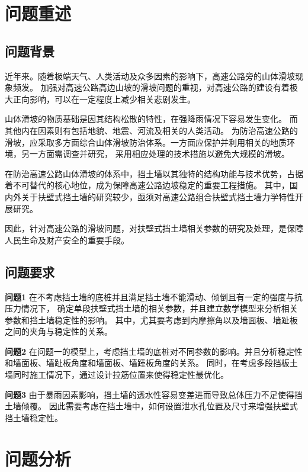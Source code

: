 \documentclass[withoutpreface,bwprint]{cumcmthesis}
\begin{document}
\section{问题重述}
\subsection{问题背景}
近年来。随着极端天气、人类活动及众多因素的影响下，高速公路旁的山体滑坡现象频发。
加强对高速公路高边山坡的滑坡问题的重视，对高速公路的建设有着极大正向影响，可以在一定程度上减少相关悲剧发生。
\par
山体滑坡的物质基础是因其结构松散的特性，在强降雨情况下容易发生变化。
而其他内在因素则有包括地貌、地震、河流及相关的人类活动。
为防治高速公路的滑坡，应采取多方面综合山体滑坡防治体系。一方面应保护并利用相关的地质环境，另一方面需调查并研究，
采用相应处理的技术措施以避免大规模的滑坡。
\par
在防治高速公路山体滑坡的体系中，挡土墙以其独特的结构功能与技术优势，占据着不可替代的核心地位，成为保障高速公路边坡稳定的重要工程措施。
其中，国内外关于扶壁式挡土墙的研究较少，亟须对高速公路组合扶壁式挡土墙力学特性开展研究。
\par
因此，针对高速公路的滑坡问题，对扶壁式挡土墙相关参数的研究及处理，是保障人民生命及财产安全的重要手段。

\subsection{问题要求}

\textbf{问题1}  
在不考虑挡土墙的底桩并且满足挡土墙不能滑动、倾倒且有一定的强度与抗压力情况下，
确定单段扶壁式挡土墙的相关参数，并且建立数学模型来分析相关参数和挡土墙稳定性的影响。
其中，尤其要考虑到内摩擦角以及墙面板、墙趾板之间的夹角与稳定性的关系。
\par
\textbf{问题2}  
在问题一的模型上，考虑挡土墙的底桩对不同参数的影响。并且分析稳定性和墙面板、墙趾板角度和墙面板、墙踵板角度的关系。
同时，在考虑多段挡板土墙同时施工情况下，通过设计拉筋位置来使得稳定性最优化。
\par
\textbf{问题3} 
由于暴雨因素影响，挡土墙的透水性容易变差进而导致总体压力不足使得挡土墙倾覆。
因此需要考虑在挡土墙中，如何设置泄水孔位置及尺寸来增强扶壁式挡土墙稳定性。


\section{问题分析}
\end{document}
